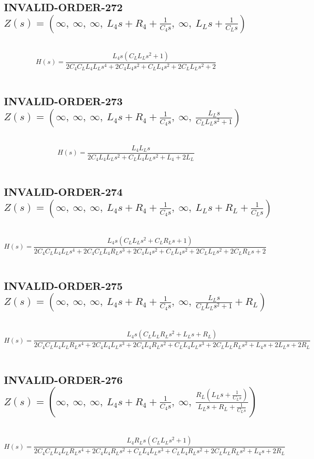 \documentclass{article}
\begin{document}
\subsection{INVALID-ORDER-272 $Z(s) = \left( \infty, \  \infty, \  \infty, \  L_{4} s + R_{4} + \frac{1}{C_{4} s}, \  \infty, \  L_{L} s + \frac{1}{C_{L} s}\right)$ } \ 
\textbf{\[H(s) = \frac{L_{4} s \left(C_{L} L_{L} s^{2} + 1\right)}{2 C_{4} C_{L} L_{4} L_{L} s^{4} + 2 C_{4} L_{4} s^{2} + C_{L} L_{4} s^{2} + 2 C_{L} L_{L} s^{2} + 2}\] } \ 
\subsection{INVALID-ORDER-273 $Z(s) = \left( \infty, \  \infty, \  \infty, \  L_{4} s + R_{4} + \frac{1}{C_{4} s}, \  \infty, \  \frac{L_{L} s}{C_{L} L_{L} s^{2} + 1}\right)$ } \ 
\textbf{\[H(s) = \frac{L_{4} L_{L} s}{2 C_{4} L_{4} L_{L} s^{2} + C_{L} L_{4} L_{L} s^{2} + L_{4} + 2 L_{L}}\] } \ 
\subsection{INVALID-ORDER-274 $Z(s) = \left( \infty, \  \infty, \  \infty, \  L_{4} s + R_{4} + \frac{1}{C_{4} s}, \  \infty, \  L_{L} s + R_{L} + \frac{1}{C_{L} s}\right)$ } \ 
\textbf{\[H(s) = \frac{L_{4} s \left(C_{L} L_{L} s^{2} + C_{L} R_{L} s + 1\right)}{2 C_{4} C_{L} L_{4} L_{L} s^{4} + 2 C_{4} C_{L} L_{4} R_{L} s^{3} + 2 C_{4} L_{4} s^{2} + C_{L} L_{4} s^{2} + 2 C_{L} L_{L} s^{2} + 2 C_{L} R_{L} s + 2}\] } \ 
\subsection{INVALID-ORDER-275 $Z(s) = \left( \infty, \  \infty, \  \infty, \  L_{4} s + R_{4} + \frac{1}{C_{4} s}, \  \infty, \  \frac{L_{L} s}{C_{L} L_{L} s^{2} + 1} + R_{L}\right)$ } \ 
\textbf{\[H(s) = \frac{L_{4} s \left(C_{L} L_{L} R_{L} s^{2} + L_{L} s + R_{L}\right)}{2 C_{4} C_{L} L_{4} L_{L} R_{L} s^{4} + 2 C_{4} L_{4} L_{L} s^{3} + 2 C_{4} L_{4} R_{L} s^{2} + C_{L} L_{4} L_{L} s^{3} + 2 C_{L} L_{L} R_{L} s^{2} + L_{4} s + 2 L_{L} s + 2 R_{L}}\] } \ 
\subsection{INVALID-ORDER-276 $Z(s) = \left( \infty, \  \infty, \  \infty, \  L_{4} s + R_{4} + \frac{1}{C_{4} s}, \  \infty, \  \frac{R_{L} \left(L_{L} s + \frac{1}{C_{L} s}\right)}{L_{L} s + R_{L} + \frac{1}{C_{L} s}}\right)$ } \ 
\textbf{\[H(s) = \frac{L_{4} R_{L} s \left(C_{L} L_{L} s^{2} + 1\right)}{2 C_{4} C_{L} L_{4} L_{L} R_{L} s^{4} + 2 C_{4} L_{4} R_{L} s^{2} + C_{L} L_{4} L_{L} s^{3} + C_{L} L_{4} R_{L} s^{2} + 2 C_{L} L_{L} R_{L} s^{2} + L_{4} s + 2 R_{L}}\] } \ 
\end{document}
